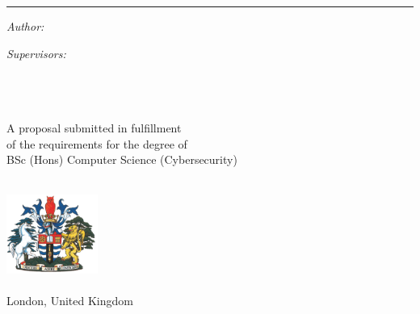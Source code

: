 \begin{titlepage}
  \doublespacing{}
  \large
  \hfill
  \vfill
  \vspace*{0.5cm}
  \begin{center}
    \doublespacing{}
    \textcolor{Blue}{\huge\textbf{\myTitle}}
  \end{center}
  \vspace{1.25cm}
  \hrule
  \vspace{1.5cm}
  \onehalfspacing{}
  \begin{center}

    \begin{minipage}[t]{0.5\textwidth}
      \begin{flushleft}
        \emph{Author:}\\
        \href{\myWebsite}{{\myFirstName} \textsc{\myLastName}}
      \end{flushleft}
    \end{minipage}
    \begin{minipage}[t]{0.4\textwidth}
      \begin{flushright}
        \emph{Supervisors:} \\
        \href{\myProfWebsite}{{\myProfTitle} {\myProfFirstName} \textsc{\myProfLastName}}\\
        \href{\myOtherProfWebsite}{{\myOtherProfTitle} {\myOtherProfFirstName} \textsc{\myOtherProfLastName}}\\
      \end{flushright}
    \end{minipage}\\[1.5cm]

    A proposal submitted in fulfillment\\
    of the requirements for the degree of\\
    {BSc (Hons) Computer Science (Cybersecurity)}\\[1cm]

    \myDepartment\\
    \myFaculty{}

    \hfill
    \vfill

    \includegraphics[width=3cm]{../shared/greenwich-coat-of-arms}\\
    \href{https://www.gre.ac.uk/}{\myUni}\\
    London, United Kingdom\\[2em]
    {\mySubmissionMonth} {\mySubmissionYear}
  \end{center}
\end{titlepage}
